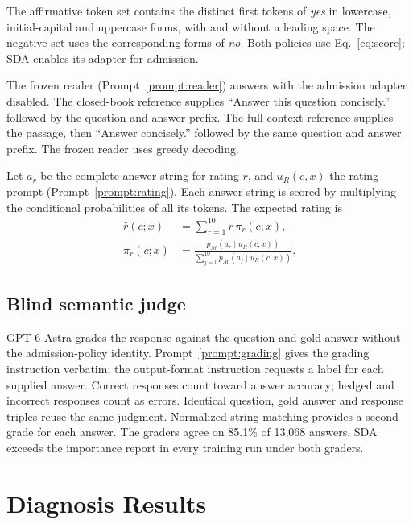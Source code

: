 The affirmative token set contains the distinct first tokens of \emph{yes} in lowercase, initial-capital and uppercase forms, with and without a leading space. The negative set uses the corresponding forms of \emph{no}. Both policies use Eq.~\eqref{eq:score}; SDA enables its adapter for admission.

The frozen reader (Prompt~\ref{prompt:reader}) answers with the admission adapter disabled. The closed-book reference supplies ``Answer this question concisely.'' followed by the question and answer prefix. The full-context reference supplies the passage, then ``Answer concisely.'' followed by the same question and answer prefix. The frozen reader uses greedy decoding.

Let $a_r$ be the complete answer string for rating $r$, and $u_R(c,x)$ the rating prompt (Prompt~\ref{prompt:rating}). Each answer string is scored by multiplying the conditional probabilities of all its tokens. The expected rating is
\begin{equation}
\begin{split}
\bar r(c;x)&=\sum_{r=1}^{10}r\,\pi_r(c;x),\\
\pi_r(c;x)&=\frac{p_{\mathcal M}(a_r\mid u_R(c,x))}
{\sum_{j=1}^{10}p_{\mathcal M}(a_j\mid u_R(c,x))}.
\end{split}
\label{eq:rating}
\end{equation}



\subsection{Blind semantic judge}
\label{app:judge}

GPT-6-Astra grades the response against the question and gold answer without the admission-policy identity. Prompt~\ref{prompt:grading} gives the grading instruction verbatim; the output-format instruction requests a label for each supplied answer. Correct responses count toward answer accuracy; hedged and incorrect responses count as errors. Identical question, gold answer and response triples reuse the same judgment. Normalized string matching provides a second grade for each answer. The graders agree on 85.1\% of 13,068 answers. SDA exceeds the importance report in every training run under both graders.

\section{Diagnosis Results}
\label{app:provenance}
\label{app:measurements}

